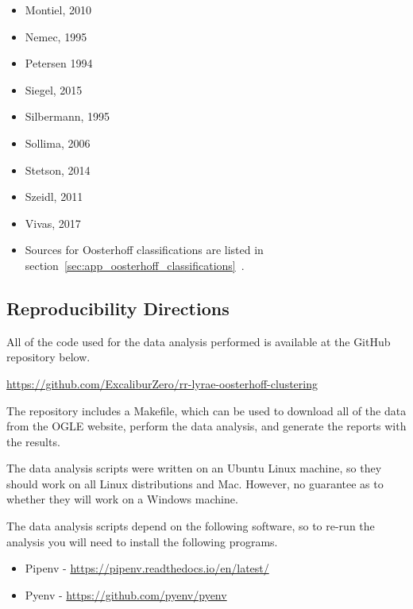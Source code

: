 \documentclass[]{article}
\begin{document}
\begin{itemize}
	\item Montiel, 2010 \cite{montiel_2010}
	\item Nemec, 1995 \cite{nemec_1995}
	\item Petersen 1994 \cite{petersen_1994}
	\item Siegel, 2015 \cite{siegel_2015}
	\item Silbermann, 1995 \cite{silbermann_1995}
	\item Sollima, 2006 \cite{sollima_2006}
	\item Stetson, 2014 \cite{stetson_2014}
	\item Szeidl, 2011 \cite{szeidl_2011}
	\item Vivas, 2017 \cite{vivas_2017}
	\item Sources for Oosterhoff classifications are listed in section~\ref{sec:app_oosterhoff_classifications}~.
\end{itemize}

\newpage

\subsection{Reproducibility Directions}
All of the code used for the data analysis performed is available at the GitHub repository below.

\vspace{12pt}

\url{https://github.com/ExcaliburZero/rr-lyrae-oosterhoff-clustering}

\vspace{12pt}

The repository includes a Makefile, which can be used to download all of the data from the OGLE website, perform the data analysis, and generate the reports with the results.

\vspace{12pt}

The data analysis scripts were written on an Ubuntu Linux machine, so they should work on all Linux distributions and Mac. However, no guarantee as to whether they will work on a Windows machine.

\vspace{12pt}

The data analysis scripts depend on the following software, so to re-run the analysis you will need to install the following programs.

\begin{itemize}
	\item Pipenv	-	\url{https://pipenv.readthedocs.io/en/latest/}
	\item Pyenv		-	\url{https://github.com/pyenv/pyenv}
\end{itemize}
\end{document}
